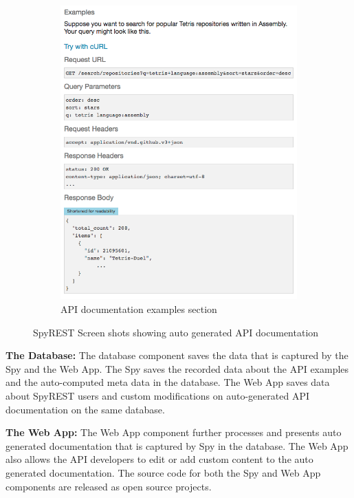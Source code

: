 \documentclass[conference]{IEEEtran}
\begin{document}
\begin{figure}[!tbh]
\begin{subfigure}[t]{0.5\textwidth}
    \includegraphics[width=\linewidth]{spyrest_examples.png}
    \caption{API documentation examples section}
    \label{fig:examples}
  \end{subfigure}
  \caption{SpyREST Screen shots showing auto generated API documentation}
  \label{fig:spyrest_screenshots}
\end{figure}

\textbf{The Database:} The database component saves the data that is captured by the Spy and the Web App. The Spy saves the recorded data about the API examples and the auto-computed meta data in the database. The Web App saves data about SpyREST users and custom modifications on auto-generated API documentation on the same database.

\textbf{The Web App:} The Web App component further processes and presents auto generated documentation that is captured by Spy in the database. The Web App also allows the API developers to edit or add custom content to the auto generated documentation. The source code for both the Spy and Web App components are released as open source projects.
\end{document}
